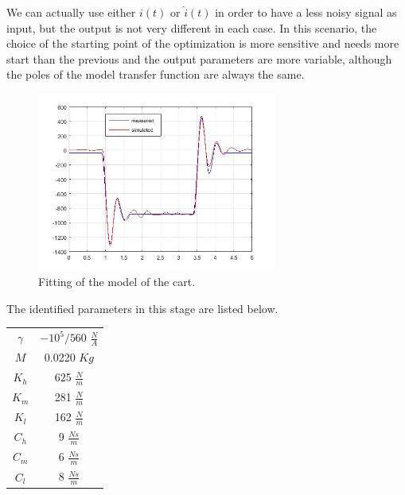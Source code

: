 We can actually use either $i(t)$ or $\hat{i}(t)$ in order to have a less noisy signal as input, but the output is not very different in each case. In this scenario, the choice of the starting point of the optimization is more sensitive and needs more start than the previous and the output parameters are more variable, although the poles of the model transfer function are always the same.
\begin{figure}[h]
\includegraphics[width=0.7\textwidth]{img/graybox_cart.jpg}
\caption{Fitting of the model of the cart.}
\end{figure}

The identified parameters in this stage are listed below.
\begin{table}
\centering
\begin{tabular}{|c|c|}
$\gamma$ & $-10^5/560$ $\frac{N}{A}$ \\
$M$ & 0.0220 $Kg$ \\
$K_h$ & 625 $\frac{N}{m}$\\
$K_m$ & 281 $\frac{N}{m}$\\
$K_l$ & 162 $\frac{N}{m}$\\
$C_h$ & 9 $\frac{Ns}{m}$\\
$C_m$ & 6 $\frac{Ns}{m}$\\
$C_l$ & 8 $\frac{Ns}{m}$\\
\end{tabular}
\end{table}
